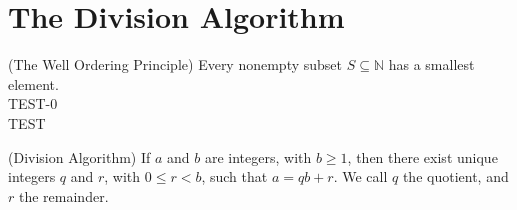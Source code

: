 \newpage

\section{The Division Algorithm} 

\begin{axiom}{(The Well Ordering Principle)}
Every nonempty subset $S \subseteq \mathbb{N}$ has a smallest element. \\ TEST-0\\
TEST \cite{apostol1976}
\end{axiom}

\begin{theorem}{(Division Algorithm)}
If $a$ and $b$ are integers, with $b \geq 1$, then there exist unique integers $q$ and $r$, with $0 \le r < b$, such that $a = qb + r$. 
We call $q$ the quotient, and $r$ the remainder.
\end{theorem}

